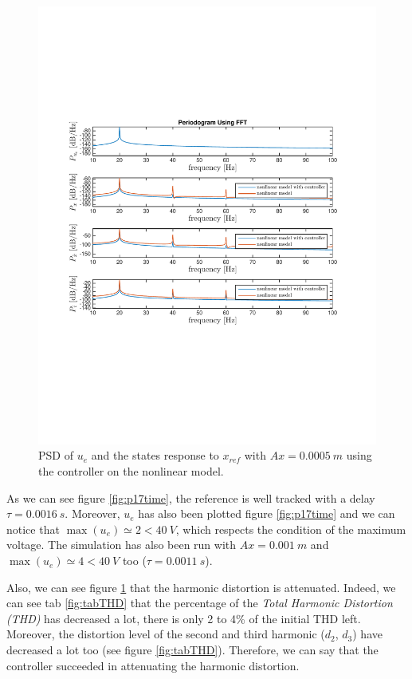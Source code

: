 \begin{figure}[H]
 \centering 
 \includegraphics[trim=0cm 7cm 0cm 7cm, clip=true, totalheight=0.35\textheight, angle=0]{figures/p17freq.pdf}
 \caption{PSD of $u_e$ and the states response to $x_{ref}$ with $Ax = 0.0005\ m$ using the controller on the nonlinear model.}
 \label{fig:p17freq}
\end{figure}

As we can see figure \ref{fig:p17time}, the reference is well tracked with a delay $\tau = 0.0016\ s$. Moreover, $u_e$ has also been plotted figure \ref{fig:p17time} and we can notice that $\max(u_e) \simeq 2 < 40\ V$, which respects the condition of the maximum voltage. The simulation has also been run with $Ax = 0.001\ m$ and $\max(u_e) \simeq 4 < 40\ V$ too ($\tau = 0.0011\ s$).

Also, we can see figure \ref{fig:p17freq} that the harmonic distortion is attenuated. Indeed, we can see tab \ref{fig:tabTHD} that the percentage of the \textit{Total Harmonic Distortion (THD)} has decreased a lot, there is only 2 to 4\% of the initial THD left. Moreover, the distortion level of the second and third harmonic ($d_2$, $d_3$) have decreased a lot too (see figure \ref{fig:tabTHD}). Therefore, we can say that the controller succeeded in attenuating the harmonic distortion.

